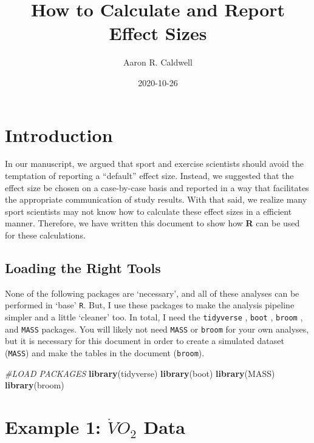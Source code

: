 \documentclass[]{tufte-handout}
\title{How to Calculate and Report Effect Sizes}
\author{Aaron R. Caldwell}
\date{2020-10-26}
\newenvironment{Shaded}{}{}
\newcommand{\CommentTok}[1]{\textcolor[rgb]{0.38,0.63,0.69}{\textit{#1}}}
\newcommand{\KeywordTok}[1]{\textcolor[rgb]{0.00,0.44,0.13}{\textbf{#1}}}
\newcommand{\NormalTok}[1]{#1}
\begin{document}
\maketitle




\hypertarget{introduction}{%
\section{Introduction}\label{introduction}}

In our manuscript, we argued that sport and exercise scientists should
avoid the temptation of reporting a ``default'' effect size. Instead, we
suggested that the effect size be chosen on a case-by-case basis and
reported in a way that facilitates the appropriate communication of
study results. With that said, we realize many sport scientists may not
know how to calculate these effect sizes in a efficient manner.
Therefore, we have written this document to show how \textbf{R}
\citep{R-base} can be used for these calculations.

\hypertarget{loading-the-right-tools}{%
\subsection{Loading the Right Tools}\label{loading-the-right-tools}}

None of the following packages are `necessary', and all of these
analyses can be performed in `base' \texttt{R}. But, I use these
packages to make the analysis pipeline simpler and a little `cleaner'
too. In total, I need the \texttt{tidyverse} \citep{tidyverse},
\texttt{boot} \citep{boot}, \texttt{broom} \citep{broom}, and
\texttt{MASS} \citep{MASS} packages. You will likely not need
\texttt{MASS} or \texttt{broom} for your own analyses, but it is
necessary for this document in order to create a simulated dataset
(\texttt{MASS}) and make the tables in the document (\texttt{broom}).

\begin{Shaded}
\begin{Highlighting}[]
\CommentTok{#LOAD PACKAGES}
\KeywordTok{library}\NormalTok{(tidyverse) }
\KeywordTok{library}\NormalTok{(boot) }
\KeywordTok{library}\NormalTok{(MASS) }
\KeywordTok{library}\NormalTok{(broom)}
\end{Highlighting}
\end{Shaded}

\hypertarget{example-1-dotvo_2-data}{%
\section{\texorpdfstring{Example 1: \(\dot{V}O_2\)
Data}{Example 1: \textbackslash dot\{V\}O\_2 Data}}\label{example-1-dotvo_2-data}}
\end{document}
